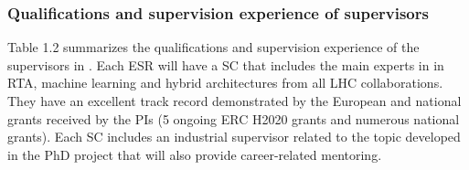 

%




\subsubsection{Qualifications and supervision experience of supervisors}
\label{subsub:qual_supervisors}


Table 1.2 summarizes the qualifications and supervision experience of the supervisors in \acronym. 
Each ESR will have a SC that includes the main experts in in RTA, machine learning and hybrid architectures from all LHC collaborations. 
They have an excellent track record demonstrated by the European and national grants received by the PIs (5 ongoing ERC H2020 grants and numerous national grants). 
Each SC includes an industrial supervisor related to the topic developed in the PhD project that will also provide career-related mentoring. 

